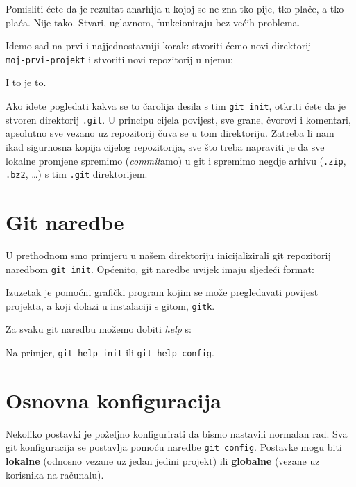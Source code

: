 Pomisliti ćete da je rezultat anarhija u kojoj se ne zna tko pije, tko plače, a tko plaća. 
Nije tako.
Stvari, uglavnom, funkcioniraju bez većih problema.

Idemo sad na prvi i najjednostavniji korak: stvoriti ćemo novi direktorij \\ \verb+moj-prvi-projekt+ i stvoriti novi repozitorij u njemu:



I to je to. 

Ako idete pogledati kakva se to čarolija desila s tim \verb+git init+, otkriti ćete da je stvoren direktorij \verb+.git+.
U principu cijela povijest, sve grane, čvorovi i komentari, apsolutno sve vezano uz repozitorij čuva se u tom direktoriju.
Zatreba li nam ikad sigurnosna kopija cijelog repozitorija, sve što treba napraviti je da sve lokalne promjene spremimo (\emph{commit}amo) u git i spremimo negdje arhivu (\verb+.zip+, \verb+.bz2+, \dots) s tim \verb+.git+ direktorijem.

\section*{Git naredbe}

U prethodnom smo primjeru u našem direktoriju inicijalizirali git repozitorij naredbom \verb+git init+.
Općenito, git naredbe uvijek imaju sljedeći format:

\gitoutput{
\color{blue}{git $<$naredba$>$ $<$opcija1$>$ $<$opcija2$>$ \dots}
}

Izuzetak je pomoćni grafički program kojim se može pregledavati povijest projekta, a koji dolazi u instalaciji s gitom, \verb+gitk+.

Za svaku git naredbu možemo dobiti \emph{help} s:


Na primjer, \verb+git help init+ ili \verb+git help config+.

\section*{Osnovna konfiguracija}

Nekoliko postavki je poželjno konfigurirati da bismo nastavili normalan rad. 
Sva git konfiguracija se postavlja pomoću naredbe \verb+git config+. 
Postavke mogu biti \textbf{lokalne} (odnosno vezane uz jedan jedini projekt) ili \textbf{globalne} (vezane uz korisnika na računalu).

